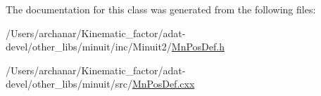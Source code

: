 The documentation for this class was generated from the following files\+:\begin{DoxyCompactItemize}
\item 
/\+Users/archanar/\+Kinematic\+\_\+factor/adat-\/devel/other\+\_\+libs/minuit/inc/\+Minuit2/\mbox{\hyperlink{adat-devel_2other__libs_2minuit_2inc_2Minuit2_2MnPosDef_8h}{Mn\+Pos\+Def.\+h}}\item 
/\+Users/archanar/\+Kinematic\+\_\+factor/adat-\/devel/other\+\_\+libs/minuit/src/\mbox{\hyperlink{adat-devel_2other__libs_2minuit_2src_2MnPosDef_8cxx}{Mn\+Pos\+Def.\+cxx}}\end{DoxyCompactItemize}
